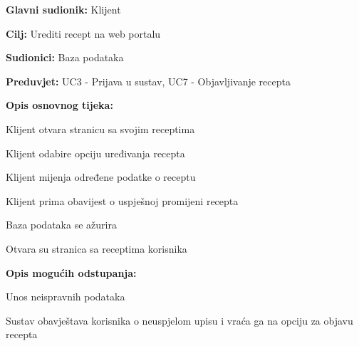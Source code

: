 					\noindent {}
					\begin{packed_item}
	
						\item \textbf{Glavni sudionik: } Klijent
						\item  \textbf{Cilj:} Urediti recept na web portalu
						\item  \textbf{Sudionici:} Baza podataka
						\item  \textbf{Preduvjet:} UC3 - Prijava u sustav, UC7 - Objavljivanje recepta
						\item  \textbf{Opis osnovnog tijeka:}
						
						\item[] \begin{packed_enum}
							
							\item Klijent otvara stranicu sa svojim receptima
							\item Klijent odabire opciju uređivanja recepta
							\item Klijent mijenja određene podatke o receptu
							\item Klijent prima obavijest o uspješnoj promijeni recepta
							\item Baza podataka se ažurira
							\item Otvara su stranica sa receptima korisnika
						\end{packed_enum}

						\item  \textbf{Opis mogućih odstupanja:}
						
						\item[] \begin{packed_item}
	
							\item[3.a] Unos neispravnih podataka
							\item[] \begin{packed_enum}
								
								\item Sustav obavještava korisnika o neuspjelom upisu i vraća ga
								na opciju za objavu recepta
								
							\end{packed_enum}
						\end{packed_item}
					\end{packed_item}

